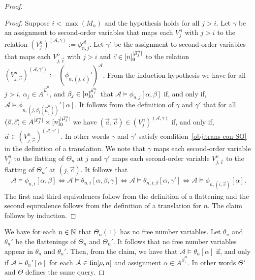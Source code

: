 \documentclass[../main/thesis.tex]{subfiles}
\begin{document}
\begin{proof}
\begin{proof}
    Suppose $i < \max(M_n)$ and the hypothesis holds for all $j > i$. Let
    $\gamma$ be an assignment to second-order variables that maps each $V^n_j$
    with $j > i$ to the relation $(V^n_j)^{(\mathcal{A}, \gamma)} :=
    \phi^{\mathcal{A}}_{n, j}$. Let $\gamma'$ be the assignment to second-order
    variables that maps each $V^n_{j, \vec{c}}$ with $j > i$ and $\vec{c} \in
    [n]^{\vert \vec{\mu}^n_j \vert}_0$ to the relation $(V^n_{j,
      \vec{c}})^{(\mathcal{A}, \gamma')} := (\phi_{n, (j,
      \vec{c})}')^{\mathcal{A}}$. From the induction hypothesis we have for all
    $j > i$, $\alpha_j \in A^{\vec{\mu}^n_j}$, and $\beta_j\in
    [n]^{\vec{\mu}^n_j}_0$ that $\mathcal{A} \models \phi_{n, j}[\alpha,
    \beta]$ if, and only if, $\mathcal{A} \models \phi_{n, (j,
      \beta_j(\vec{\mu}^n_j))}' [\alpha]$. It follows from the definition of
    $\gamma$ and $\gamma'$ that for all $(\vec{a}, \vec{c}) \in A^{\vert
      \vec{x}^n_j\vert} \times [n]^{\vert \vec{\mu}^n_j \vert}_0$ we have
    $(\vec{a}, \vec{c}) \in (V^n_{j})^{(\mathcal{A}, \gamma)}$ if, and only if,
    $\vec{a} \in (V^n_{j, \vec{c}})^{(\mathcal{A}, \gamma')}$. In other words
    $\gamma$ and $\gamma'$ satisfy condition~\ref{obj:trans-con-SO} in the
    definition of a translation. We note that $\gamma$ maps each second-order
    variable $V^n_{j}$ to the flatting of $\Theta_n$ at $j$ and $\gamma'$ maps
    each second-order variable $V^n_{j, \vec{c}}$ to the flatting of $\Theta_n'$
    at $(j, \vec{c})$. It follows that
    \begin{align*}
      \mathcal{A} \models \phi_{n, i} [\alpha, \beta] \iff \mathcal{A} \models \theta_{n, i}[\alpha, \beta, \gamma] \iff \mathcal{A} \models \theta_{n, i ; \beta}[\alpha, \gamma'] \iff \mathcal{A} \models \phi_{n, (i, \vec{c})}[\alpha].
    \end{align*}
    The first and third equivalences follow from the definition of a flattening
    and the second equivalence follows from the definition of a translation for
    $n$. The claim follows by induction.
  \end{proof}

  We have for each $n \in \mathbb{N}$ that $\Theta_n(1)$ has no free number
  variables. Let $\theta_n$ and $\theta_n'$ be the flattenings of $\Theta_n$ and
  $\Theta_n'$. It follows that no free number variables appear in $\theta_n$ and
  $\theta_n'$. Then, from the claim, we have that $\mathcal{A} \models
  \theta_n[\alpha]$ if, and only if $\mathcal{A} \models \theta_n'[\alpha]$ for
  each $\mathcal{A} \in \text{\upshape fin}{[\rho, n]}$ and assignment $\alpha \in
  A^{\vec{x}^n_1}$. In other words $\Theta'$ and $\Theta$ defines the same
  query.


\end{proof}
\end{document}
